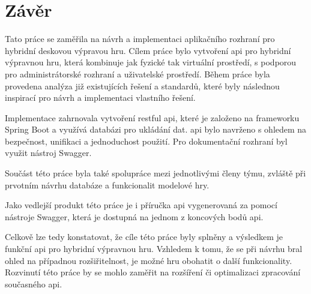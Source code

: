 \chapter{Závěr}
Tato práce se zaměřila na návrh a implementaci aplikačního rozhraní pro hybridní deskovou výpravou hru. Cílem práce bylo vytvoření \gls{api} pro hybridní výpravnou hru, která kombinuje jak fyzické tak virtuální prostředí, s podporou pro administrátorské rozhraní a uživatelské prostředí. Během práce byla provedena analýza již existujících řešení a standardů, které byly následnou inspirací pro návrh a implementaci vlastního řešení.

Implementace zahrnovala vytvoření \gls{restful api}, které je založeno na frameworku Spring Boot a využívá databázi pro ukládání dat. \gls{api} bylo navrženo s ohledem na bezpečnost, unifikaci a jednoduchost použití. Pro dokumentační rozhraní byl využit nástroj Swagger. 

Součást této práce byla také spolupráce mezi jednotlivými členy týmu, zvláště při prvotním návrhu databáze a funkcionalit modelové hry. 

Jako vedlejší produkt této práce je i příručka \gls{api} vygenerovaná za pomocí nástroje Swagger, která je dostupná na jednom z koncových bodů \gls{api}.

Celkově lze tedy konstatovat, že cíle této práce byly splněny a výsledkem je funkční \gls{api} pro hybridní výpravnou hru. Vzhledem k tomu, že se při návrhu bral ohled na případnou rozšiřitelnost, je možné hru obohatit o další funkcionality. Rozvinutí této práce by se mohlo zaměřit na rozšíření či optimalizaci zpracování současného \gls{api}.

\endinput